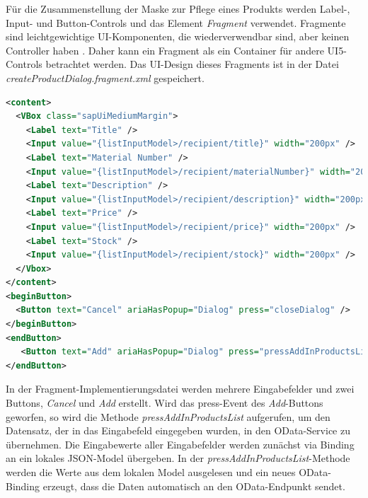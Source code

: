 Für die Zusammenstellung der Maske zur Pflege eines Produkts werden Label-, Input- und Button-Controls und das Element \textit{Fragment} verwendet.  Fragmente sind leichtgewichtige UI-Komponenten, die wiederverwendbar sind, aber keinen Controller haben \cite{sud:s16}. Daher kann ein Fragment als ein Container für andere UI5-Controls betrachtet werden. Das UI-Design dieses Fragments ist in der Datei \textit{createProductDialog.fragment.xml} gespeichert.

\begin{lstlisting}[language=XML, caption=Auszüge aus der Fragment \texttt{createProductDialog.fragment.xml}]
<content>
  <VBox class="sapUiMediumMargin">
    <Label text="Title" />
    <Input value="{listInputModel>/recipient/title}" width="200px" />
    <Label text="Material Number" />
    <Input value="{listInputModel>/recipient/materialNumber}" width="200px" />
    <Label text="Description" />
    <Input value="{listInputModel>/recipient/description}" width="200px" />
    <Label text="Price" />
    <Input value="{listInputModel>/recipient/price}" width="200px" />
    <Label text="Stock" />
    <Input value="{listInputModel>/recipient/stock}" width="200px" />
  </Vbox>
</content>
<beginButton>
  <Button text="Cancel" ariaHasPopup="Dialog" press="closeDialog" />
</beginButton>
<endButton>
   <Button text="Add" ariaHasPopup="Dialog" press="pressAddInProductsList" />
</endButton>
\end{lstlisting}

In der Fragment-Implementierungsdatei werden mehrere Eingabefelder und zwei Buttons, \textit{Cancel} und \textit{Add} erstellt. Wird das press-Event des \textit{Add}-Buttons geworfen, so wird die Methode \textit{pressAddInProductsList} aufgerufen, um den Datensatz, der in das Eingabefeld eingegeben wurden, in den OData-Service zu übernehmen. Die Eingabewerte aller Eingabefelder werden zunächst via Binding an ein lokales JSON-Model übergeben. In der \textit{pressAddInProductsList}-Methode werden die Werte aus dem lokalen Model ausgelesen und ein neues OData-Binding erzeugt, dass die Daten automatisch an den OData-Endpunkt sendet.

